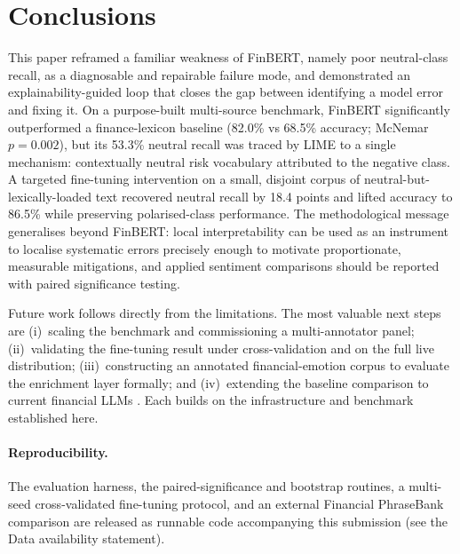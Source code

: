 \documentclass[12pt,a4paper]{article}
\begin{document}
\section{Conclusions}\label{sec:conclusion}
This paper reframed a familiar weakness of FinBERT, namely poor neutral-class recall,
as a diagnosable and repairable failure mode, and demonstrated an
explainability-guided loop that closes the gap between identifying a model error and
fixing it. On a purpose-built multi-source benchmark, FinBERT significantly
outperformed a finance-lexicon baseline (82.0\% vs 68.5\% accuracy; McNemar
$p = 0.002$), but its 53.3\% neutral recall was traced by LIME to a single mechanism:
contextually neutral risk vocabulary attributed to the negative class. A targeted
fine-tuning intervention on a small, disjoint corpus of neutral-but-lexically-loaded
text recovered neutral recall by 18.4 points and lifted accuracy to 86.5\% while
preserving polarised-class performance. The methodological message generalises beyond
FinBERT: local interpretability can be used as an instrument to localise systematic
errors precisely enough to motivate proportionate, measurable mitigations, and
applied sentiment comparisons should be reported with paired significance testing.

Future work follows directly from the limitations. The most valuable next steps are
(i)~scaling the benchmark and commissioning a multi-annotator panel; (ii)~validating
the fine-tuning result under cross-validation and on the full live distribution;
(iii)~constructing an annotated financial-emotion corpus to evaluate the enrichment
layer formally; and (iv)~extending the baseline comparison to current financial LLMs
\citep{wu2023,fatouros2023}. Each builds on the infrastructure and benchmark
established here.

\paragraph{Reproducibility.}\label{sec:reprod}
The evaluation harness, the paired-significance and bootstrap routines, a multi-seed
cross-validated fine-tuning protocol, and an external Financial PhraseBank
comparison are released as runnable code accompanying this submission (see the Data
availability statement).

\end{document}
